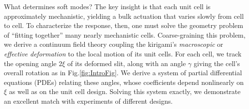 \documentclass[aps,prl,twocolumn,superscriptaddress]{revtex4-1}
\begin{document}






What determines soft modes? The key insight is that each unit cell is  approximately mechanistic, yielding a bulk actuation that varies slowly from cell to cell. To characterize the response, then, one must solve the geometry problem of ``fitting together'' many nearly mechanistic cells. %
Coarse-graining this problem, we derive a continuum field theory coupling the kirigami's \textit{macroscopic} or \textit{effective deformation} to the local motion of its unit cells. For each cell, we track the opening angle  $2\xi$ of its deformed slit, along with an angle $\gamma$ giving the cell's overall rotation as in Fig.\;\ref{fig:IntroFig}. %
We derive a system of partial differential equations (PDEs) relating these angles, whose coefficients depend nonlinearly on $\xi$ as well as on the unit cell design. Solving this system exactly, we demonstrate an excellent match with experiments of different designs. 
\end{document}
